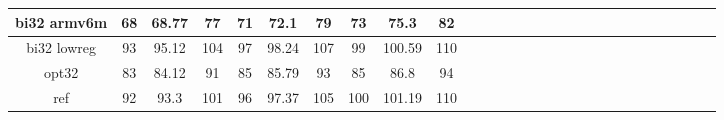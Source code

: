 \documentclass{report}
\begin{document}
\begin{landscape}
\begin{table}[]
\begin{adjustbox}{width=600pt}
\begin{tabular}{|c|c|c|c|c|c|c|c|c|c|c|c|c|c|c|c|c|c|c|c|c|c|c|c|c|c|c|c|}
				\hline
				bi32 armv6m & 68 & 68.77 & 77 & 71 & 72.1 & 79 & 73 & 75.3 & 82 & & & & & & & & & & & & & & & & & & \\
				\hline
				bi32 lowreg & 93 & 95.12 & 104 & 97 & 98.24 & 107 & 99 & 100.59 & 110 & & & & & & & & & & & & & & & & & & \\
				\hline
				opt32 & 83 & 84.12 & 91 & 85 & 85.79 & 93 & 85 & 86.8 & 94 & & & & & & & & & & & & & & & & & & \\
				\hline
				ref & 92 & 93.3 & 101 & 96 & 97.37 & 105 & 100 & 101.19 & 110 & & & & & & & & & & & & & & & & & & \\
				\hline
			\end{tabular}
		\end{adjustbox}
	\end{table}
\end{landscape}
\end{document}
